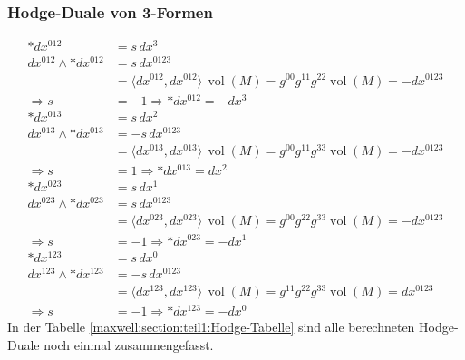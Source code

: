 \subsubsection{Hodge-Duale von 3-Formen}
\begin{align*}
	\ast dx^{012} &= s \, dx^3 \\
	dx^{012} \wedge \ast dx^{012} &= s \, dx^{0123} \\
	&= \langle dx^{012}, dx^{012} \rangle \, \operatorname{vol}(M) 
	= g^{00} g^{11} g^{22} \operatorname{vol}(M) = -dx^{0123} \\
	\Rightarrow s &= -1 \Rightarrow \boxed{\ast dx^{012} = - dx^3}
	\\[1em]
	\ast dx^{013} &= s \, dx^2 \\
	dx^{013} \wedge \ast dx^{013} &= -s \, dx^{0123} \\
	&= \langle dx^{013}, dx^{013} \rangle \, \operatorname{vol}(M) 
	= g^{00} g^{11} g^{33} \operatorname{vol}(M) = -dx^{0123} \\
	\Rightarrow s &= 1 \Rightarrow \boxed{\ast dx^{013} = dx^2}
	\\[1em]
	\ast dx^{023} &= s \, dx^1 \\
	dx^{023} \wedge \ast dx^{023} &= s \, dx^{0123} \\
	&= \langle dx^{023}, dx^{023} \rangle \, \operatorname{vol}(M) 
	= g^{00} g^{22} g^{33} \operatorname{vol}(M) = -dx^{0123} \\
	\Rightarrow s &= -1 \Rightarrow \boxed{\ast dx^{023} = - dx^1}
	\\[1em]
	\ast dx^{123} &= s \, dx^0 \\
	dx^{123} \wedge \ast dx^{123} &= -s \, dx^{0123} \\
	&= \langle dx^{123}, dx^{123} \rangle \, \operatorname{vol}(M)
	= g^{11} g^{22} g^{33} \operatorname{vol}(M) = dx^{0123} \\
	\Rightarrow s &= -1 \Rightarrow \boxed{\ast dx^{123} = - dx^0}
\end{align*}
In der Tabelle \ref{maxwell:section:teil1:Hodge-Tabelle} sind alle berechneten Hodge-Duale noch einmal zusammengefasst.
